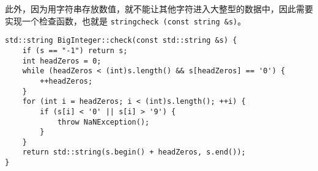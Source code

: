 {此外，因为用字符串存放数值，就不能让其他字符进入大整型的数据中，因此需要实现一个检查函数，也就是 \lstinline{stringcheck (const string &s)}。

\begin{lstlisting}[firstnumber=301, caption="\lstinline{check} 函数实现"]
std::string BigInteger::check(const std::string &s) {
    if (s == "-1") return s;
    int headZeros = 0;
    while (headZeros < (int)s.length() && s[headZeros] == '0') {
        ++headZeros;
    }
    for (int i = headZeros; i < (int)s.length(); ++i) {
        if (s[i] < '0' || s[i] > '9') {
            throw NaNException();
        }
    }
    return std::string(s.begin() + headZeros, s.end());
}
\end{lstlisting}
}